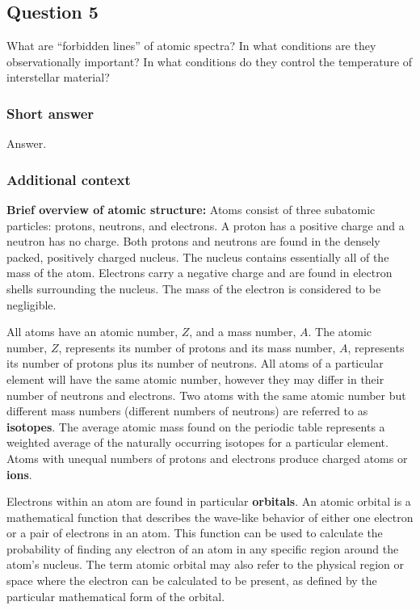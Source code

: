 \documentclass[a4paper,10pt]{article}
\begin{document}

\newpage
\subsection{Question 5}

What are ``forbidden lines'' of atomic spectra? In what conditions are they observationally important? In what conditions do they control the temperature of interstellar material?

\subsubsection{Short answer}

Answer.

\subsubsection{Additional context}

{\noindent}\textbf{Brief overview of atomic structure:} Atoms consist of three subatomic particles: protons, neutrons, and electrons. A proton has a positive charge and a neutron has no charge. Both protons and neutrons are found in the densely packed, positively charged nucleus. The nucleus contains essentially all of the mass of the atom. Electrons carry a negative charge and are found in electron shells surrounding the nucleus. The mass of the electron is considered to be negligible.

{\noindent}All atoms have an atomic number, $Z$, and a mass number, $A$. The atomic number, $Z$, represents its number of protons and its mass number, $A$, represents its number of protons plus its number of neutrons. All atoms of a particular element will have the same atomic number, however they may differ in their number of neutrons and electrons. Two atoms with the same atomic number but different mass numbers (different numbers of neutrons) are referred to as \textbf{isotopes}. The average atomic mass found on the periodic table represents a weighted average of the naturally occurring isotopes for a particular element. Atoms with unequal numbers of protons and electrons produce charged atoms or \textbf{ions}.

{\noindent}Electrons within an atom are found in particular \textbf{orbitals}. An atomic orbital is a mathematical function that describes the wave-like behavior of either one electron or a pair of electrons in an atom. This function can be used to calculate the probability of finding any electron of an atom in any specific region around the atom's nucleus. The term atomic orbital may also refer to the physical region or space where the electron can be calculated to be present, as defined by the particular mathematical form of the orbital. 
\end{document}
